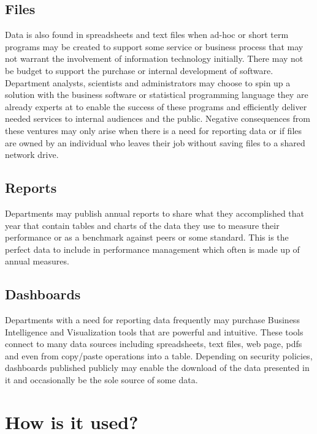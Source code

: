 \documentclass[
  openany]{book}
\begin{document}
\hypertarget{files}{%
\subsection{Files}\label{files}}

Data is also found in spreadsheets and text files when ad-hoc or short term programs may be created to support some service or business process that may not warrant the involvement of information technology initially. There may not be budget to support the purchase or internal development of software. Department analysts, scientists and administrators may choose to spin up a solution with the business software or statistical programming language they are already experts at to enable the success of these programs and efficiently deliver needed services to internal audiences and the public. Negative consequences from these ventures may only arise when there is a need for reporting data or if files are owned by an individual who leaves their job without saving files to a shared network drive.

\hypertarget{reports}{%
\subsection{Reports}\label{reports}}

Departments may publish annual reports to share what they accomplished that year that contain tables and charts of the data they use to measure their performance or as a benchmark against peers or some standard. This is the perfect data to include in performance management which often is made up of annual measures.

\hypertarget{dashboards}{%
\subsection{Dashboards}\label{dashboards}}

Departments with a need for reporting data frequently may purchase Business Intelligence and Visualization tools that are powerful and intuitive. These tools connect to many data sources including spreadsheets, text files, web page, pdfs and even from copy/paste operations into a table. Depending on security policies, dashboards published publicly may enable the download of the data presented in it and occasionally be the sole source of some data.

\hypertarget{how-is-it-used}{%
\section{How is it used?}\label{how-is-it-used}}
\end{document}
